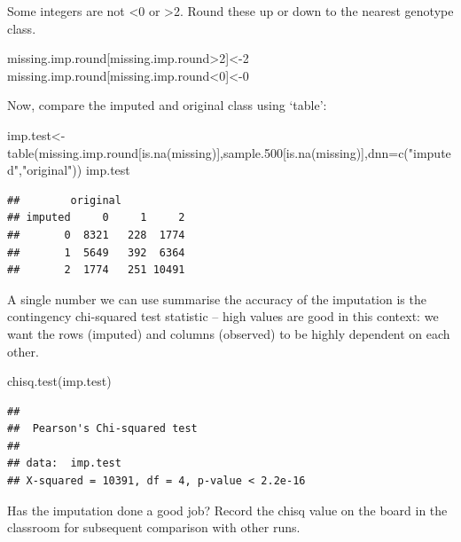 \documentclass[
]{book}
\newenvironment{Shaded}{\begin{snugshade}}{\end{snugshade}}
\newcommand{\AttributeTok}[1]{\textcolor[rgb]{0.77,0.63,0.00}{#1}}
\newcommand{\DecValTok}[1]{\textcolor[rgb]{0.00,0.00,0.81}{#1}}
\newcommand{\FloatTok}[1]{\textcolor[rgb]{0.00,0.00,0.81}{#1}}
\newcommand{\FunctionTok}[1]{\textcolor[rgb]{0.00,0.00,0.00}{#1}}
\newcommand{\NormalTok}[1]{#1}
\newcommand{\OtherTok}[1]{\textcolor[rgb]{0.56,0.35,0.01}{#1}}
\newcommand{\SpecialCharTok}[1]{\textcolor[rgb]{0.00,0.00,0.00}{#1}}
\newcommand{\StringTok}[1]{\textcolor[rgb]{0.31,0.60,0.02}{#1}}
\begin{document}
Some integers are not \textless0 or \textgreater2. Round these up or down to the nearest genotype class.

\begin{Shaded}
\begin{Highlighting}[]
\NormalTok{missing.imp.round[missing.imp.round}\SpecialCharTok{\textgreater{}}\DecValTok{2}\NormalTok{]}\OtherTok{\textless{}{-}}\DecValTok{2}
\NormalTok{missing.imp.round[missing.imp.round}\SpecialCharTok{\textless{}}\DecValTok{0}\NormalTok{]}\OtherTok{\textless{}{-}}\DecValTok{0}
\end{Highlighting}
\end{Shaded}

Now, compare the imputed and original class using `table':

\begin{Shaded}
\begin{Highlighting}[]
\NormalTok{imp.test}\OtherTok{\textless{}{-}}\FunctionTok{table}\NormalTok{(missing.imp.round[}\FunctionTok{is.na}\NormalTok{(missing)],sample}\FloatTok{.500}\NormalTok{[}\FunctionTok{is.na}\NormalTok{(missing)],}\AttributeTok{dnn=}\FunctionTok{c}\NormalTok{(}\StringTok{"imputed"}\NormalTok{,}\StringTok{"original"}\NormalTok{))}
\NormalTok{imp.test}
\end{Highlighting}
\end{Shaded}

\begin{verbatim}
##        original
## imputed     0     1     2
##       0  8321   228  1774
##       1  5649   392  6364
##       2  1774   251 10491
\end{verbatim}

A single number we can use summarise the accuracy of the imputation is the contingency chi-squared test statistic -- high values are good in this context: we want the rows (imputed) and columns (observed) to be highly dependent on each other.

\begin{Shaded}
\begin{Highlighting}[]
\FunctionTok{chisq.test}\NormalTok{(imp.test) }
\end{Highlighting}
\end{Shaded}

\begin{verbatim}
## 
##  Pearson's Chi-squared test
## 
## data:  imp.test
## X-squared = 10391, df = 4, p-value < 2.2e-16
\end{verbatim}

Has the imputation done a good job? Record the chisq value on the board in the classroom for subsequent comparison with other runs.
\end{document}
